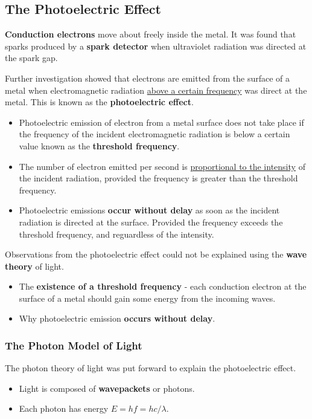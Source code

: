 \subsection{The Photoelectric Effect}

\textbf{Conduction electrons} move about freely inside the metal. It was found that sparks produced by a \textbf{spark detector} when ultraviolet radiation was directed at the spark gap.

Further investigation showed that electrons are emitted from the surface of a metal when electromagnetic radiation \underline{above a certain frequency} was direct at the metal. This is known as the \textbf{photoelectric effect}.

\begin{itemize}
    \item Photoelectric emission of electron from a metal surface does not take place if the frequency of the incident electromagnetic radiation is below a certain value known as the \textbf{threshold frequency}.
    \item The number of electron emitted per second is \underline{proportional to the intensity} of the incident radiation, provided the frequency is greater than the threshold frequency.
    \item Photoelectric emissions \textbf{occur without delay} as soon as the incident radiation is directed at the surface. Provided the frequency exceeds the threshold frequency, and reguardless of the intensity.
\end{itemize}

Observations from the photoelectric effect could not be explained using the \textbf{wave theory} of light.
\begin{itemize}
    \item The \textbf{existence of a threshold frequency} - each conduction electron at the surface of a metal should gain some energy from the incoming waves.
    \item Why photoelectric emission \textbf{occurs without delay}.
\end{itemize}

\subsubsection*{The Photon Model of Light}

The photon theory of light was put forward to explain the photoelectric effect.
\begin{itemize}
    \item Light is composed of \textbf{wavepackets} or photons.
    \item Each photon has energy $E=hf=hc/\lambda$.
\end{itemize}

